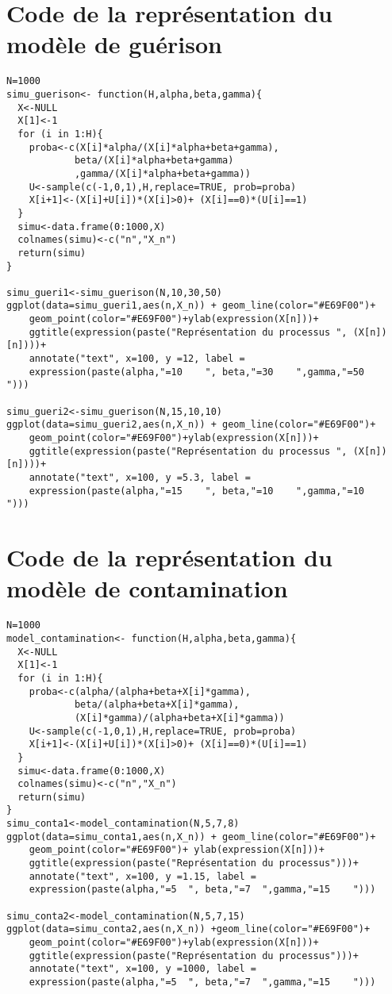 \documentclass[12pt,a4paper]{report}
\theoremstyle{remark}
\begin{document}
\section*{Code de la représentation du modèle de guérison}
\begin{lstlisting}
N=1000
simu_guerison<- function(H,alpha,beta,gamma){
  X<-NULL
  X[1]<-1
  for (i in 1:H){
    proba<-c(X[i]*alpha/(X[i]*alpha+beta+gamma),
            beta/(X[i]*alpha+beta+gamma)
            ,gamma/(X[i]*alpha+beta+gamma))
    U<-sample(c(-1,0,1),H,replace=TRUE, prob=proba)
    X[i+1]<-(X[i]+U[i])*(X[i]>0)+ (X[i]==0)*(U[i]==1)
  }
  simu<-data.frame(0:1000,X)
  colnames(simu)<-c("n","X_n")
  return(simu)
}

simu_gueri1<-simu_guerison(N,10,30,50)
ggplot(data=simu_gueri1,aes(n,X_n)) + geom_line(color="#E69F00")+
    geom_point(color="#E69F00")+ylab(expression(X[n]))+ 
    ggtitle(expression(paste("Représentation du processus ", (X[n])[n])))+
    annotate("text", x=100, y =12, label = 
    expression(paste(alpha,"=10    ", beta,"=30    ",gamma,"=50    ")))

simu_gueri2<-simu_guerison(N,15,10,10)
ggplot(data=simu_gueri2,aes(n,X_n)) + geom_line(color="#E69F00")+
    geom_point(color="#E69F00")+ylab(expression(X[n]))+ 
    ggtitle(expression(paste("Représentation du processus ", (X[n])[n])))+
    annotate("text", x=100, y =5.3, label = 
    expression(paste(alpha,"=15    ", beta,"=10    ",gamma,"=10    ")))
\end{lstlisting}

\section*{Code de la représentation du modèle de contamination}

\begin{lstlisting}
N=1000
model_contamination<- function(H,alpha,beta,gamma){
  X<-NULL
  X[1]<-1
  for (i in 1:H){
    proba<-c(alpha/(alpha+beta+X[i]*gamma),
            beta/(alpha+beta+X[i]*gamma),
            (X[i]*gamma)/(alpha+beta+X[i]*gamma))
    U<-sample(c(-1,0,1),H,replace=TRUE, prob=proba)
    X[i+1]<-(X[i]+U[i])*(X[i]>0)+ (X[i]==0)*(U[i]==1)
  }
  simu<-data.frame(0:1000,X)
  colnames(simu)<-c("n","X_n")
  return(simu)
}
simu_conta1<-model_contamination(N,5,7,8)
ggplot(data=simu_conta1,aes(n,X_n)) + geom_line(color="#E69F00")+
    geom_point(color="#E69F00")+ ylab(expression(X[n]))+ 
    ggtitle(expression(paste("Représentation du processus")))+
    annotate("text", x=100, y =1.15, label = 
    expression(paste(alpha,"=5  ", beta,"=7  ",gamma,"=15    ")))

simu_conta2<-model_contamination(N,5,7,15)
ggplot(data=simu_conta2,aes(n,X_n)) +geom_line(color="#E69F00")+
    geom_point(color="#E69F00")+ylab(expression(X[n]))+
    ggtitle(expression(paste("Représentation du processus")))+
    annotate("text", x=100, y =1000, label =
    expression(paste(alpha,"=5  ", beta,"=7  ",gamma,"=15    ")))
\end{lstlisting}
\end{document}

